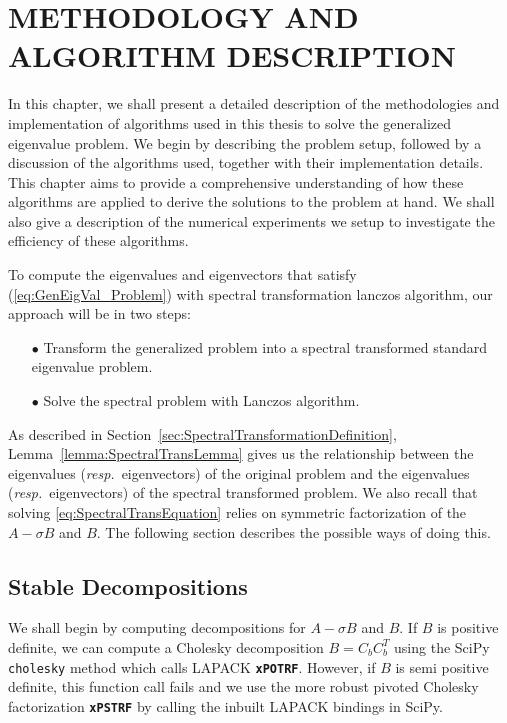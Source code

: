 \chapter{METHODOLOGY AND ALGORITHM DESCRIPTION}

In this chapter, we shall present a detailed description of the methodologies and implementation of algorithms used in this thesis to solve the generalized eigenvalue problem. We begin by describing the problem setup, followed by a discussion of the algorithms used, together with their implementation details. This chapter aims to provide a comprehensive understanding of how these algorithms are applied to derive the solutions to the problem at hand. We shall also give a description of the numerical experiments we setup to investigate the efficiency of these algorithms.

To compute the eigenvalues and eigenvectors that satisfy (\ref{eq:GenEigVal_Problem}) with spectral transformation lanczos algorithm, our approach will be in two steps:
\begin{itemize}
	\item[$\bullet$] Transform the generalized problem into a spectral transformed standard eigenvalue problem.
	\item[$\bullet$] Solve the spectral problem with Lanczos algorithm.
\end{itemize}
As described in Section~\ref{sec:SpectralTransformationDefinition}, 
Lemma~\ref{lemma:SpectralTransLemma} gives us the relationship between the eigenvalues (\textit{resp.}\ eigenvectors) of the original problem and the eigenvalues (\textit{resp.}\ eigenvectors) of the spectral transformed problem. We also recall that solving \ref{eq:SpectralTransEquation} relies on symmetric factorization of the $A - \sigma B$ and $B$. The following section describes the possible ways of doing this.
\section{Stable Decompositions}\label{sec:StableDecompositions}
We shall begin by computing decompositions for $A - \sigma B$ and $B$. If $B$ is positive  definite, we can compute a Cholesky decomposition $B = C_bC_b^T$ using the SciPy \texttt{cholesky} method which calls LAPACK \textbf{\texttt{xPOTRF}}. However, if $B$ is semi positive definite, this function call fails and we use the more robust pivoted Cholesky factorization \textbf{\texttt{xPSTRF}} by calling the inbuilt LAPACK bindings in SciPy.

